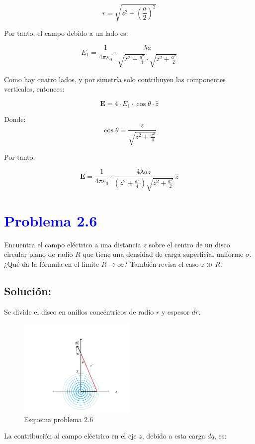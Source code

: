 \documentclass[12pt]{article}
\newcommand{\question}[1]{\textcolor{blue}{\textbf{#1}}}
\begin{document}
\[
r = \sqrt{z^2 + \left(\frac{a}{2}\right)^2}
\]

Por tanto, el campo debido a un lado es:

\[
E_1 = \frac{1}{4\pi\varepsilon_0} \cdot \frac{\lambda a}{\sqrt{z^2 + \frac{a^2}{4}} \cdot \sqrt{z^2 + \frac{a^2}{2}}}
\]

Como hay cuatro lados, y por simetría solo contribuyen las componentes verticales, entonces:

\[
\mathbf{E} = 4 \cdot E_1 \cdot \cos\theta \cdot \hat{z}
\]

Donde: 
\[
\cos\theta = \frac{z}{\sqrt{z^2 + \frac{a^2}{4}}}
\]

Por tanto:


\[
\boxed{
\mathbf{E} = \frac{1}{4\pi\varepsilon_0} \cdot \frac{4\lambda a z}{\left(z^2 + \frac{a^2}{4}\right) \sqrt{z^2 + \frac{a^2}{2}}} \, \hat{z}
}
\]

\section*{\question{Problema 2.6} }Encuentra el campo eléctrico a una distancia \( z \) sobre el centro de un disco circular plano de radio \( R \) que tiene una densidad de carga superficial uniforme \( \sigma \). ¿Qué da la fórmula en el límite \( R \to \infty \)? También revisa el caso \( z \gg R \).

\subsection*{Solución:}
Se divide el disco en anillos concéntricos de radio \( r \) y espesor \( dr \). 

\begin{figure}[ht] 
    \centering
    \includegraphics[width=0.5\textwidth]{imagenes/eje2.6.jpg} 
    \caption{Esquema problema 2.6}
    \label{Esquema3}
\end{figure}


La contribución al campo eléctrico en el eje \( z \), debido a esta carga \( dq \), es:
\end{document}
